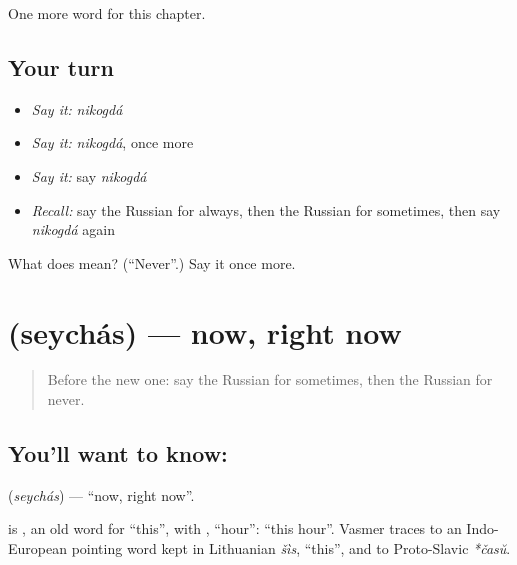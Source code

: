 \begin{grammarlens}[title={What you've built}]
One more word for this chapter.
\end{grammarlens}

\subsection*{Your turn}
\begin{itemize}
\raggedright
  \item \emph{Say it:} \emph{nikogdá}
  \item \emph{Say it:} \emph{nikogdá}, once more
  \item \emph{Say it:} say \emph{nikogdá}
  \item \emph{Recall:} say the Russian for always, then the Russian for sometimes, then say \emph{nikogdá} again
\end{itemize}

\begin{tcolorbox}[breakable,colback=teal!4,colframe=teal!35!black,title={Before you move on}]
What does  mean? (\textquotedblleft{}Never\textquotedblright{}.) Say it once more.
\end{tcolorbox}
\section[\texorpdfstring{\ru{сейчас} (seychás)}{сейчас (seychás)}]{ (seychás) — now, right now}

\label{lesson:RU-C74-now}



\begin{quote}
Before the new one: say the Russian for sometimes, then the Russian for never.
\end{quote}

\subsection*{You'll want to know: }
\textbf{} (\emph{seychás}) — \textquotedblleft{}now, right now\textquotedblright{}.

\begin{cousinweb}
\textbf{} is \emph{}, an old word for \textquotedblleft{}this\textquotedblright{}, with \emph{}, \textquotedblleft{}hour\textquotedblright{}: \textquotedblleft{}this hour\textquotedblright{}. Vasmer traces \emph{} to an Indo-European pointing word kept in Lithuanian \emph{šìs}, \textquotedblleft{}this\textquotedblright{}, and \emph{} to Proto-Slavic \emph{*časŭ}.
\end{cousinweb}

